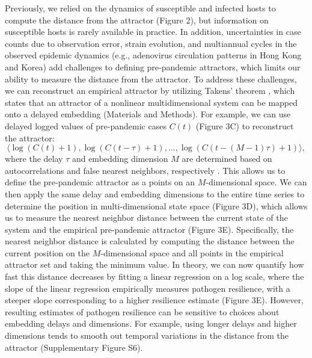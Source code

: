 \documentclass[12pt]{article}
\begin{document}
Previously, we relied on the dynamics of susceptible and infected hosts to compute the distance from the attractor (Figure 2), but information on susceptible hosts is rarely available in practice.
In addition, uncertainties in case counts due to observation error, strain evolution, and multiannual cycles in the observed epidemic dynamics (e.g., adenovirus circulation patterns in Hong Kong and Korea) add challenges to defining pre-pandemic attractors, which limits our ability to measure the distance from the attractor.
To address these challenges, we can reconstruct an empirical attractor by utilizing Takens' theorem \citep{takens2006detecting}, which states that an attractor of a nonlinear multidimensional system can be mapped onto a delayed embedding (Materials and Methods).
For example, we can use delayed logged values of pre-pandemic cases $C(t)$ (Figure 3C) to reconstruct the attractor:
\begin{equation}
\langle\log(C(t)+1), \log(C(t-\tau)+1), \dots, \log(C(t-(M-1)\tau)+1)\rangle,
\end{equation}
where the delay $\tau$ and embedding dimension $M$ are determined based on autocorrelations and false nearest neighbors, respectively \citep{kennel1992determining,tan2023selecting}.
This allows us to define the pre-pandemic attractor as a points on an $M$-dimensional space.
We can then apply the same delay and embedding dimensions to the entire time series to determine the position in multi-dimensional state space (Figure 3D), which allows us to measure the nearest neighbor distance between the current state of the system and the empirical pre-pandemic attractor (Figure 3E).
Specifically, the nearest neighbor distance is calculated by computing the distance between the current position on the $M$-dimensional space and all points in the empirical attractor set and taking the minimum value.
In theory, we can now quantify how fast this distance decreases by fitting a linear regression on a log scale, where the slope of the linear regression empirically measures pathogen resilience, with a steeper slope corresponding to a higher resilience estimate (Figure 3E).
However, resulting estimates of pathogen resilience can be sensitive to choices about embedding delays and dimensions.
For example, using longer delays and higher dimensions tends to smooth out temporal variations in the distance from the attractor (Supplementary Figure S6).
\end{document}
